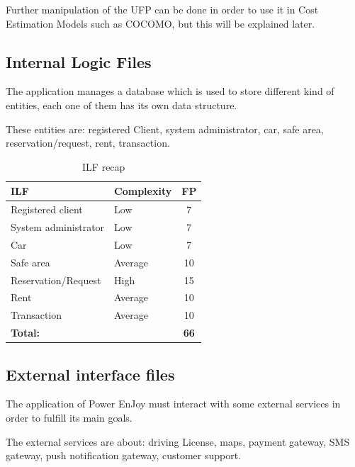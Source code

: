 Further manipulation of the UFP can be done in order to use it in Cost Estimation Models such as COCOMO, but this will be explained later.

\clearpage
\subsection{Internal Logic Files}
The application manages a database which is used to store different kind of entities, each one of them has its own data structure.

These entities are: registered Client, system administrator, car, safe area, reservation/request, rent, transaction.

\begin{table}[!h]
\centering
\caption{ILF recap}
\label{itl-recap}
\begin{tabularx}{\linewidth}{XXc}
\hline
\textbf{ILF}                       & \textbf{Complexity} & \textbf{FP} \\ \hline
Registered client         & Low        & 7 \\
System administrator      & Low        & 7   \\
Car                       & Low        & 7  \\
Safe area                 & Average    & 10  \\
Reservation/Request       & High       & 15   \\
Rent                      & Average    & 10 \\
Transaction               & Average    & 10 \\ \hline
\textbf{Total:}           &            & \textbf{66}
\end{tabularx}
\end{table}

\subsection{External interface files}
The application of Power EnJoy must interact with some external services in order to fulfill its main goals.

The external services are about: driving License, maps, payment gateway, SMS gateway, push notification gateway, customer support.

